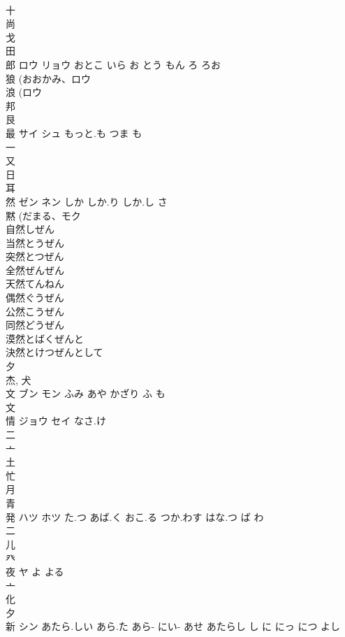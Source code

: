 \documentclass[8pt]{extreport}
\begin{document}
\begin{CJK}{UTF8}{min}
\\	十 
\\	尚 
\\	戈 
\\	田 
\\	郎	ロウ リョウ	おとこ いら お とう もん ろ ろお	
\\	狼 (おおかみ、ロウ 
\\	浪 (ロウ 
\\	邦 
\\	艮 
\\	最	サイ シュ	もっと.も つま も	
\\	一 
\\	又 
\\	日 
\\	耳 
\\	然	ゼン ネン	しか しか.り しか.し さ	
\\	黙 (だまる、モク 
\\	自然しぜん
\\	当然とうぜん
\\	突然とつぜん
\\	全然ぜんぜん
\\	天然てんねん
\\	偶然ぐうぜん
\\	公然こうぜん
\\	同然どうぜん
\\	漠然とばくぜんと
\\	決然とけつぜんとして
\\	夕 
\\	杰, 犬 
\\	文	ブン モン	ふみ あや かざり ふ も	
\\	文 
\\	情	ジョウ セイ	なさ.け	
\\	二 
\\	亠 
\\	土 
\\	忙 
\\	月 
\\	青 
\\	発	ハツ ホツ	た.つ あば.く おこ.る つか.わす はな.つ ば わ	
\\	二 
\\	儿 
\\	癶 
\\	夜	ヤ	よ よる	
\\	亠 
\\	化 
\\	夕 
\\	新	シン	あたら.しい あら.た あら- にい- あせ あたらし し に にっ につ よし	

\end{CJK}
\end{document}
